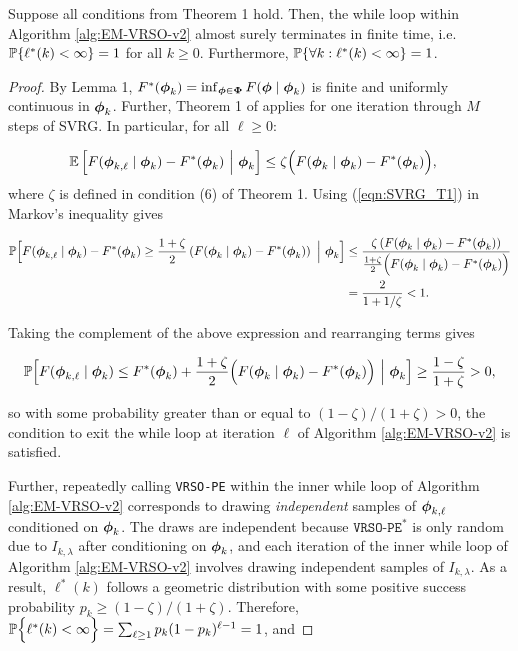 \begin{lemma}
    Suppose all conditions from Theorem 1 hold. Then, the while loop within Algorithm \ref{alg:EM-VRSO-v2} almost surely terminates in finite time, i.e. $\mathbb{P}\{\ell^*(k) < \infty\} = 1$ for all $k \geq 0$. Furthermore, $\mathbb{P}\{\forall k : \ell^*(k) < \infty \} = 1$.
\end{lemma}

\begin{proof}

By Lemma 1, $F^*(\boldsymbol{\phi}_k) = \inf_{\boldsymbol{\phi} \in \boldsymbol{\Phi}} F(\boldsymbol{\phi} \mid \boldsymbol{\phi}_k)$ is finite and uniformly continuous in $\boldsymbol{\phi}_k$. Further, Theorem 1 of \citet{Johnson:2013} applies for one iteration through $M$ steps of SVRG. In particular, for all $\ell \geq 0$:

\begin{align}
    \mathbb{E} & \left[F(\boldsymbol{\phi}_{k,\ell} \mid \boldsymbol{\phi}_{k}) - F^*(\boldsymbol{\phi}_k) ~\Big\vert~ \boldsymbol{\phi}_{k} \right] \leq \zeta \Big(F(\boldsymbol{\phi}_{k} \mid \boldsymbol{\phi}_{k}) - F^*(\boldsymbol{\phi}_k) \Big), \label{eqn:SVRG_T1}
\end{align}
%
where $\zeta$ is defined in condition (6) of Theorem 1. Using (\ref{eqn:SVRG_T1}) in Markov's inequality gives

\begin{align}
    \mathbb{P} \Big[F(\boldsymbol{\phi}_{k,\ell} \mid \boldsymbol{\phi}_{k}) - F^*(\boldsymbol{\phi}_{k}) \geq \frac{1 + \zeta}{2} \left(F(\boldsymbol{\phi}_{k} \mid \boldsymbol{\phi}_{k}) - F^*(\boldsymbol{\phi}_k) \right) ~\Big\vert~ \boldsymbol{\phi}_{k} \Big] &\leq \frac{\zeta \left( F(\boldsymbol{\phi}_{k} \mid \boldsymbol{\phi}_{k}) - F^*(\boldsymbol{\phi}_k) \right)}{\frac{1+\zeta}{2} \Big( F(\boldsymbol{\phi}_{k} \mid \boldsymbol{\phi}_{k}) - F^*(\boldsymbol{\phi}_k) \Big)} \\
    &= \frac{2}{1 + 1/\zeta} < 1.
\end{align}

Taking the complement of the above expression and rearranging terms gives

\begin{equation}
    \mathbb{P} \Big[F(\boldsymbol{\phi}_{k,\ell} \mid \boldsymbol{\phi}_{k}) \leq F^*(\boldsymbol{\phi}_{k}) + \frac{1 + \zeta}{2} \Big(F(\boldsymbol{\phi}_{k} \mid \boldsymbol{\phi}_{k}) - F^*(\boldsymbol{\phi}_{k}) \Big) ~\Big\vert~ \boldsymbol{\phi}_{k} \Big] \geq \frac{1-\zeta}{1 + \zeta} > 0 \label{eqn:markov_ineq},
\end{equation}

so with some probability greater than or equal to $(1-\zeta)/(1+\zeta) > 0$, the condition to exit the while loop at iteration $\ell$ of Algorithm \ref{alg:EM-VRSO-v2} is satisfied.

Further, repeatedly calling \texttt{VRSO-PE} within the inner while loop of Algorithm \ref{alg:EM-VRSO-v2} corresponds to drawing \textit{independent} samples of $\boldsymbol{\phi}_{k,\ell}$ conditioned on $\boldsymbol{\phi}_k$. The draws are independent because $\texttt{VRSO-PE}^*$ is only random due to $I_{k,\lambda}$ after conditioning on $\boldsymbol{\phi}_k$, and each iteration of the inner while loop of Algorithm \ref{alg:EM-VRSO-v2} involves drawing independent samples of $I_{k,\lambda}$. As a result, $\ell^*(k)$ follows a geometric distribution with some positive success probability $p_k \geq (1-\zeta)/(1+\zeta)$. Therefore, $\mathbb{P}\Big\{\ell^*(k) < \infty \Big\} = \sum_{\ell \geq 1} p_k(1-p_k)^{\ell-1} = 1$, and 


\end{proof}
